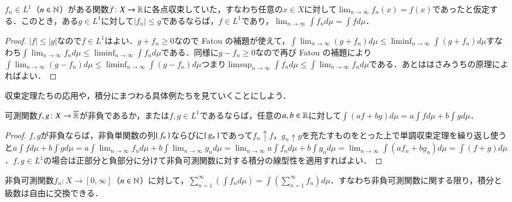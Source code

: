 \begin{thm}
$f_n \in L^1$（$n \in \mathbb{N}$）がある関数$f \colon X \to \mathbb{R}$に各点収束していた，すなわち任意の$x \in X$に対して$\lim_{n \to \infty} f_n(x) = f(x)$であったと仮定する．このとき，ある$g \in L^1$に対して$|f_n| \leq g$であるならば，$f \in L^1$であり，$\lim_{n\to\infty} \int f_n d\mu = \int f d \mu$．
\end{thm}

\begin{proof}
$|f| \leq |g|$なので$f \in L^1$はよい．$g+f_n \geq 0$なので Fatou の補題が使えて，$\int \lim_{n \to \infty} (g+f_n) d \mu \leq \liminf_{n \to \infty} \int (g+f_n) d \mu$すなわち$\int \lim_{n \to \infty} f_n d \mu \leq \liminf_{n \to \infty} \int f_n d \mu$である．同様に$g-f_n \geq 0$なので再び Fatou の補題により$\int \lim_{n \to \infty} (g-f_n) d \mu \leq \liminf_{n \to \infty} \int (g-f_n) d \mu$つまり$\limsup_{n \to \infty} \int f_n d \mu \leq \int \lim_{n \to \infty} f_n d \mu$である．あとははさみうちの原理によればよい．
\end{proof}

収束定理たちの応用や，積分にまつわる具体例たちを見ていくことにしよう．

\begin{cor}[積分の線型性]
可測関数$f, g \colon X \to \overline{\mathbb{R}}$が非負であるか，または$f,g \in L^1$であるならば，任意の$a,b \in \mathbb{R}$に対して$\int (af+bg) d\mu = a\int f d \mu + b\int g d \mu$．
\end{cor}

\begin{proof}
$f,g$が非負ならば，非負単関数の列$\set{f_n}$ならびに$\set{g_n}$であって$f_n \uparrow f$，$g_n \uparrow g$を充たすものをとった上で単調収束定理を繰り返し使うと$a\int f d \mu + b\int g d \mu = a \int \lim_{n\to \infty}  f_n d\mu  + b \int \lim_{n\to \infty}  g_n d\mu = \lim_{n\to \infty} a \int f_n d\mu  + b \int g_n d\mu = \lim_{n\to \infty}\int (af_n + bg_n) d\mu = \int (f+g) d\mu$．$f,g \in L^1$の場合は正部分と負部分に分けて非負可測関数に対する積分の線型性を適用すればよい．
\end{proof}

\begin{thm}
非負可測関数$f_n \colon X \to [0,\infty]$（$n \in \mathbb{N}$）に対して，$\sum_{n=1}^\infty \left(\int f_n d \mu\right)  = \int  \left(\sum_{n=1}^\infty f_n\right) d \mu$．すなわち非負可測関数に関する限り，積分と級数は自由に交換できる．
\end{thm}


